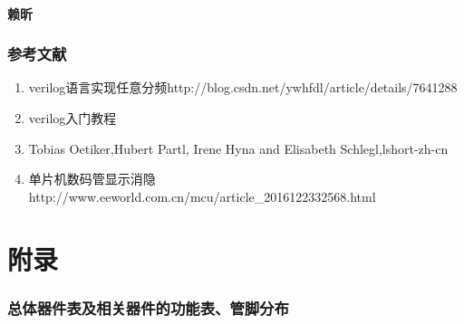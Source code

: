 \documentclass[a4paper,11pt]{ctexart}
\begin{document}
\subsection{赖昕}


\section{参考文献}

\begin{enumerate}
  \item verilog语言实现任意分频http://blog.csdn.net/ywhfdl/article/details/7641288
  \item verilog入门教程
  \item Tobias Oetiker,Hubert Partl, Irene Hyna and Elisabeth Schlegl,lshort-zh-cn
  \item 单片机数码管显示消隐 http://www.eeworld.com.cn/mcu/article\_2016122332568.html
\end{enumerate}

\newpage
\appendix
\part{附录}
\section{总体器件表及相关器件的功能表、管脚分布}
\end{document}
